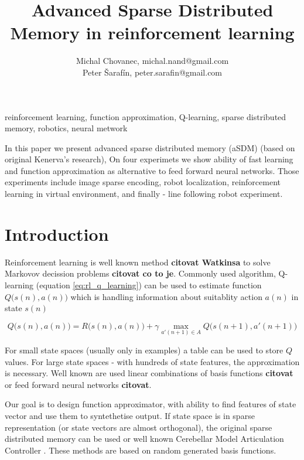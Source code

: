 \documentclass[10pt,a4paper]{article}
\begin{document}
\title{Advanced Sparse Distributed Memory in reinforcement learning}
\author{Michal Chovanec, michal.nand@gmail.com \\
Peter Šarafín, peter.sarafin@gmail.com}
\date{}
\maketitle
\thispagestyle{empty}


 reinforcement learning, function approximation, Q-learning, sparse distributed memory, robotics, neural metwork

In this paper we present advanced sparse distributed memory (aSDM) (based on original Kenerva's research),
On four experimets we show ability of fast learning and function approximation as alternative to
feed forward neural networks. Those experiments include image sparse encoding, robot localization,
reinforcement learning in virtual environment, and finally - line following robot experiment.

\section{Introduction}

Reinforcement learning is well known method {\bf citovat Watkinsa} to solve Markovov decission problems {\bf citovat co to je}.
Commonly used algorithm, Q-learning (equation \ref{eq:rl_q_learning}) can be used to estimate
function $Q\Big(s(n), a(n)\Big)$ which is handling information about suitablity action $a(n)$ in
state $s(n)$

\begin{equation}
  \label{eq:rl_q_learning}
  Q\Big(s(n), a(n)\Big) = R\Big(s(n), a(n)\Big) + \gamma \max_{a'(n+1) \in A} Q\Big(s (n+1), a'(n+1)\Big)
\end{equation}

For small state spaces (usually only in examples) a table can be used to store $Q$ values.
For large state spaces - with hundreds of state features, the approximation is necessary.
Well known are used linear combinations of basis functions {\bf citovat} or feed forward neural networks {\bf citovat}.

Our goal is to design function approximator, with ability to find features of state vector and use
them to syntethetise output. If state space is in sparse representation (or state vectors are almost orthogonal),
the original sparse distributed memory can be used \cite{bib:sdm_01} or well known Cerebellar Model Articulation Controller \cite{bib:sdm_02}.
These methods are based on random generated basis functions.
\end{document}
